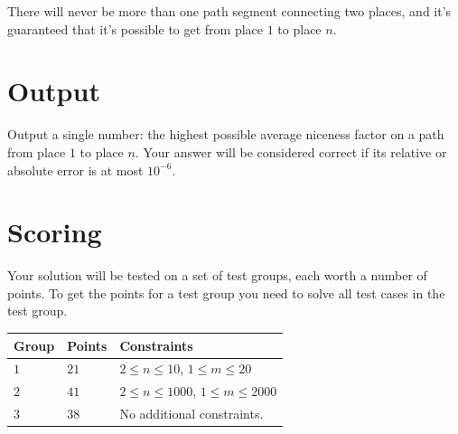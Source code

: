 There will never be more than one path segment connecting two places, and it's guaranteed that it's possible to get from place $1$ to place $n$.

\section*{Output}
Output a single number: the highest possible average niceness factor on a path from place $1$ to place $n$.
Your answer will be considered correct if its relative or absolute error is at most $10^{-6}$.

\section*{Scoring}
Your solution will be tested on a set of test groups, each worth a number of points.
To get the points for a test group you need to solve all test cases in the test group.

\noindent
\begin{tabular}{| l | l | p{12cm} |}
  \hline
  Group & Points & Constraints \\ \hline
  $1$   & $21$       & $2 \le n \le 10$, $1 \le m \le 20$ \\ \hline
  $2$   & $41$       & $2 \le n \le 1000$, $1 \le m \le 2000$\\ \hline
  $3$   & $38$       & No additional constraints. \\ \hline
\end{tabular}
